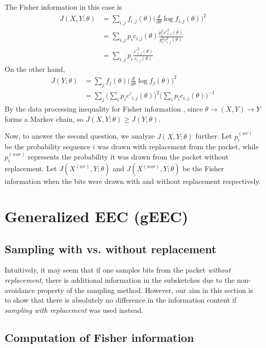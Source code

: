 \documentclass[12pt]{article}
\numberwithin{equation}{section}
\numberwithin{table}{section}
\numberwithin{figure}{section}
\begin{document}
The Fisher information in this case is
\begin{align}
\nonumber
J(X,Y;\theta) &= \sum_{i,j} f_{i,j}(\theta) \Big(\frac{d}{d\theta}\log f_{i,j}(\theta)\Big)^2\\
\nonumber
&= \sum_{i,j} p_i c_{i,j}(\theta) \frac{p^2_i c'^2_{i,j}(\theta)}{p^2_i c^2_{i,j}(\theta)}\\
\label{eq:FI_joint}
& = \sum_{i,j}  p_i\frac{c'^2_{i,j}(\theta)}{c_{i,j}(\theta)}
\end{align}
On the other hand,
\begin{align}
\nonumber
J(Y;\theta) &= \sum_{j}  f_{j}(\theta) \Big(\frac{d}{d\theta}\log f_{j}(\theta)\Big)^2\\
\label{eq:FI_received}
&= \sum_{j} \Big(\sum_i p_i c'_{i,j}(\theta) \Big)^2 \Big(\sum_i p_i c_{i,j}(\theta) \Big)^{-1} 
\end{align}
By the data processing inequality for Fisher information \cite{Zamir98DPI}, since $\theta \to (X,Y) \to Y$ forms a Markov chain, so
$J(X,Y;\theta) \ge J(Y;\theta)$. 

Now, to answer the second question, we analyze $J(X,Y;\theta)$ further. Let $p^{(wr)}_i$ be the probability sequence $i$ was drawn
with replacement from the packet, while $p^{(wor)}_i$ represents the probability it was drawn from the packet without replacement. Let 
$J(X^{(wr)},Y;\theta)$ and $J(X^{(wor)},Y;\theta)$ be the Fisher information when the bits were drawn with and without replacement 
respectively.


\section{Generalized EEC (gEEC)}

\subsection{Sampling with vs. without replacement}

Intuitively, it may seem that if one samples bits from the packet \textit{without replacement}, there is additional information in the subsketches 
due to the non-avoidance property of the sampling method. However, our aim in this section is to show that there is absolutely no difference
in the information content if \textit{sampling with replacement} was used instead.


\subsection{Computation of Fisher information}
\end{document}
